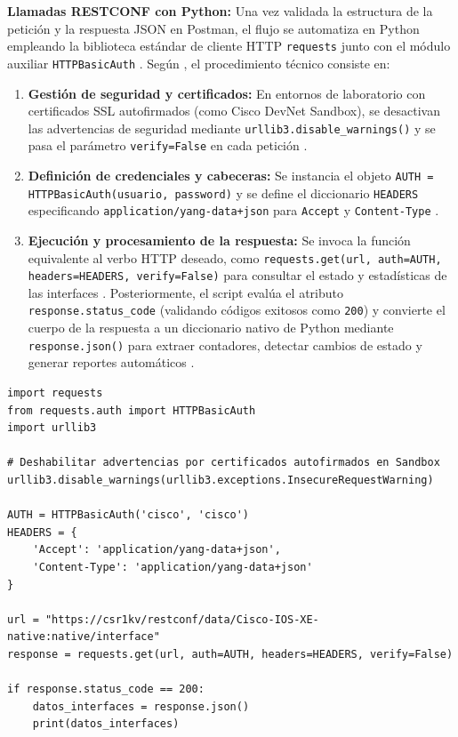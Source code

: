 \documentclass[12pt,a4paper]{article}
\begin{document}
\textbf{Llamadas RESTCONF con Python:} Una vez validada la estructura de la petición y la respuesta JSON en Postman, el flujo se automatiza en Python empleando la biblioteca estándar de cliente HTTP \texttt{requests} junto con el módulo auxiliar \texttt{HTTPBasicAuth} \parencite{roman2019}. Según \textcite{roman2019}, el procedimiento técnico consiste en:
\begin{enumerate}
    \item \textbf{Gestión de seguridad y certificados:} En entornos de laboratorio con certificados SSL autofirmados (como Cisco DevNet Sandbox), se desactivan las advertencias de seguridad mediante \texttt{urllib3.disable\_warnings()} y se pasa el parámetro \texttt{verify=False} en cada petición \parencite{roman2019, cisco_devnet}.
    \item \textbf{Definición de credenciales y cabeceras:} Se instancia el objeto \texttt{AUTH = HTTPBasicAuth(usuario, password)} y se define el diccionario \texttt{HEADERS} especificando \texttt{application/yang-data+json} para \texttt{Accept} y \texttt{Content-Type} \parencite{roman2019}.
    \item \textbf{Ejecución y procesamiento de la respuesta:} Se invoca la función equivalente al verbo HTTP deseado, como \texttt{requests.get(url, auth=AUTH, headers=HEADERS, verify=False)} para consultar el estado y estadísticas de las interfaces \parencite{roman2019}. Posteriormente, el script evalúa el atributo \texttt{response.status\_code} (validando códigos exitosos como \texttt{200}) y convierte el cuerpo de la respuesta a un diccionario nativo de Python mediante \texttt{response.json()} para extraer contadores, detectar cambios de estado y generar reportes automáticos \parencite{roman2019, granderath2023}.
\end{enumerate}

\begin{lstlisting}[caption={Ejemplo de consulta RESTCONF a interfaces mediante la librería \texttt{requests} en Python (adaptado de Roman, 2019)}]
import requests
from requests.auth import HTTPBasicAuth
import urllib3

# Deshabilitar advertencias por certificados autofirmados en Sandbox
urllib3.disable_warnings(urllib3.exceptions.InsecureRequestWarning)

AUTH = HTTPBasicAuth('cisco', 'cisco')
HEADERS = {
    'Accept': 'application/yang-data+json',
    'Content-Type': 'application/yang-data+json'
}

url = "https://csr1kv/restconf/data/Cisco-IOS-XE-native:native/interface"
response = requests.get(url, auth=AUTH, headers=HEADERS, verify=False)

if response.status_code == 200:
    datos_interfaces = response.json()
    print(datos_interfaces)
\end{lstlisting}
\end{document}
